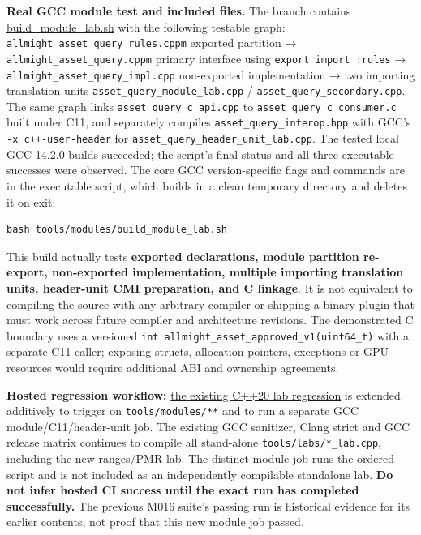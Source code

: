 \textbf{Real GCC module test and included files.} The branch contains \hyperref[source-file-e1b7c3e4f52da0e7c9c36a41]{build\_module\_lab.sh} with the following testable graph: \texttt{allmight\_asset\_query\_rules.cppm} exported partition → \texttt{allmight\_asset\_query.cppm} primary interface using \texttt{export\ import\ :rules} → \texttt{allmight\_asset\_query\_impl.cpp} non-exported implementation → two importing translation units \texttt{asset\_query\_module\_lab.cpp} / \texttt{asset\_query\_secondary.cpp}. The same graph links \texttt{asset\_query\_c\_api.cpp} to \texttt{asset\_query\_c\_consumer.c} built under C11, and separately compiles \texttt{asset\_query\_interop.hpp} with GCC's \texttt{-x\ c++-user-header} for \texttt{asset\_query\_header\_unit\_lab.cpp}. The tested local GCC 14.2.0 builds succeeded; the script's final status and all three executable successes were observed. The core GCC version-specific flags and commands are in the executable script, which builds in a clean temporary directory and deletes it on exit:

\begin{verbatim}
bash tools/modules/build_module_lab.sh
\end{verbatim}

This build actually tests \textbf{exported declarations, module partition re-export, non-exported implementation, multiple importing translation units, header-unit CMI preparation, and C linkage}. It is not equivalent to compiling the source with any arbitrary compiler or shipping a binary plugin that must work across future compiler and architecture revisions. The demonstrated C boundary uses a versioned \texttt{int\ allmight\_asset\_approved\_v1(uint64\_t)} with a separate C11 caller; exposing structs, allocation pointers, exceptions or GPU resources would require additional ABI and ownership agreements.

\textbf{Hosted regression workflow:} \hyperref[source-file-3b1d957d4b185d11d5c207e1]{the existing C++20 lab regression} is extended additively to trigger on \texttt{tools/modules/**} and to run a separate GCC module/C11/header-unit job. The existing GCC sanitizer, Clang strict and GCC release matrix continues to compile all stand-alone \texttt{tools/labs/*\_lab.cpp}, including the new ranges/PMR lab. The distinct module job runs the ordered script and is not included as an independently compilable standalone lab. \textbf{Do not infer hosted CI success until the exact run has completed successfully.} The previous M016 suite's passing run is historical evidence for its earlier contents, not proof that this new module job passed.

